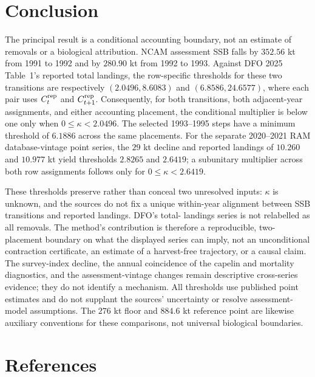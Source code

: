 \documentclass[10pt,twocolumn]{article}
\theoremstyle{plain}
\theoremstyle{remark}
\begin{document}
\section{Conclusion}\label{conclusion}

The principal result is a conditional accounting boundary, not an
estimate of removals or a biological attribution. NCAM assessment SSB
falls by \(352.56\) kt from 1991 to 1992 and by \(280.90\) kt from
1992 to 1993. Against DFO 2025 Table~1's reported total landings, the
row-specific thresholds for these two transitions are respectively
\((2.0496,8.6083)\) and \((6.8586,24.6577)\), where each pair uses
\(C_t^{\rm rep}\) and \(C_{t+1}^{\rm rep}\). Consequently, for both
transitions, both adjacent-year assignments, and either accounting
placement, the conditional multiplier is below one only when
\(0\leq\kappa<2.0496\). The selected 1993--1995 steps have a minimum
threshold of \(6.1886\) across the same placements. For the separate
2020--2021 RAM database-vintage point series, the \(29\) kt decline and
reported landings of \(10.260\) and \(10.977\) kt yield thresholds
\(2.8265\) and \(2.6419\); a subunitary multiplier across both row
assignments follows only for \(0\leq\kappa<2.6419\).

These thresholds preserve rather than conceal two unresolved inputs:
\(\kappa\) is unknown, and the sources do not fix a unique within-year
alignment between SSB transitions and reported landings. DFO's total-
landings series is not relabelled as all removals. The method's
contribution is therefore a reproducible, two-placement boundary on
what the displayed series can imply, not an unconditional contraction
certificate, an estimate of a harvest-free trajectory, or a causal
claim. The survey-index decline, the annual coincidence of the
capelin and mortality diagnostics, and the assessment-vintage changes
remain descriptive cross-series evidence; they do not identify a
mechanism. All thresholds use published point estimates and do not
supplant the sources' uncertainty or resolve assessment-model
assumptions. The \(276\) kt floor and \(884.6\) kt reference point are
likewise auxiliary conventions for these comparisons, not universal
biological boundaries.

\section*{References}
\end{document}
